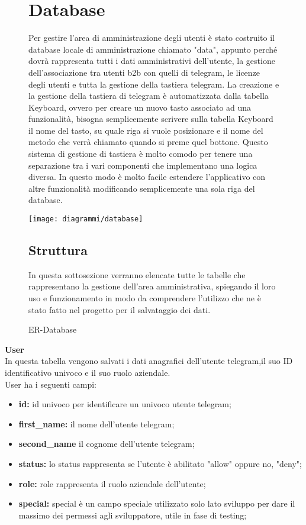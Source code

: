 \begin{figure}[h!]
\section{Database}
\label{sec:database}

Per gestire l'area di amministrazione degli utenti è stato costruito il database locale di amministrazione chiamato "data", appunto perché dovrà rappresenta tutti i dati amministrativi dell'utente, la gestione dell'associazione tra utenti b2b con quelli di telegram, le licenze degli utenti e tutta la gestione della tastiera telegram. La creazione e la  gestione della tastiera di telegram è automatizzata dalla tabella Keyboard, ovvero per creare un nuovo tasto associato ad una funzionalità, bisogna semplicemente scrivere sulla tabella Keyboard il nome del tasto, su quale riga si vuole posizionare e il nome del metodo che verrà chiamato quando si preme quel bottone. Questo sistema di gestione di tastiera è molto comodo per tenere una separazione tra i vari componenti che implementano una logica diversa. In questo modo è molto facile estendere l'applicativo con altre funzionalità modificando semplicemente una sola riga del database. 

   \begin{center}
     \texttt{[image: diagrammi/database]} 
    \caption{ER-Database }
    \end{center}

\subsection{Struttura}
In questa sottosezione verranno elencate tutte le tabelle che rappresentano la gestione dell'area amministrativa, spiegando il loro uso e funzionamento in modo da comprendere l'utilizzo che ne è stato fatto nel progetto per il salvataggio dei dati. \\
\end{figure}
\textbf{User} \\ 

In questa tabella vengono salvati i dati anagrafici dell'utente telegram,il suo ID identificativo univoco e il suo ruolo aziendale. \\

User ha i seguenti campi: \\ 
\begin{itemize}
\item \textbf{id:}  id univoco per identificare un univoco utente telegram;
\item \textbf{first\_name:} il nome dell'utente telegram;
\item \textbf{second\_name } il cognome dell'utente telegram;
\item \textbf{status:} lo status rappresenta se l'utente è abilitato "allow" oppure no, "deny";
\item \textbf{role:} role rappresenta il ruolo aziendale dell'utente;
\item \textbf{special:} special è un campo speciale utilizzato solo lato sviluppo per dare il massimo dei  permessi agli sviluppatore, utile in fase di testing;
\end{itemize}

